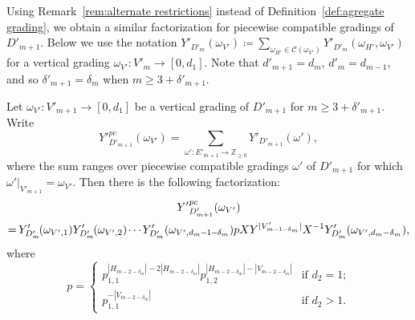 \documentclass[ALCO,ThmDefs,Unicode,epreuves]{cedram}
\newcommand{\cC}{\mathcal{C}}
\newcommand{\ZZ}{\mathbb{Z}}
\newcommand*{\mk}{\mkern -1mu}
\newcommand*{\Mk}{\mkern -2mu}
\begin{document}
Using Remark~\ref{rem:alternate restrictions} instead of Definition~\ref{def:agregate grading}, we obtain a similar factorization for piecewise compatible gradings of $D'_{m+1}$.
Below we use the notation $Y'_{D'_m}(\omega_{V'})\coloneqq \sum_{\omega_{H'}\in\cC(\omega_{V'})}Y'_{D'_m}(\omega_{H'},\omega_{V'})$ for a vertical grading $\omega_{V'}:V'_m\to[0,d_1]$.
Note that $d'_{m+1}=d_m$, $d'_m=d_{m-1}$, and so $\delta'_{m+1}=\delta_m$ when $m\ge3+\delta'_{m+1}$.
\begin{lemma}
 \label{le:piecewise compatible factorization 2}
 Let $\omega_{V'}:V'_{m+1}\to[0,d_1]$ be a vertical grading of $D'_{m+1}$ for $m\ge3+\delta'_{m+1}$.
 Write 
 \[{Y'}_{D'_{m+1}}^{pc}(\omega_{V'})=\sum\limits_{\omega':E'_{m+1}\to\ZZ_{\ge0}} Y'_{D'_{m+1}}(\omega'),\]
 where the sum ranges over piecewise compatible gradings $\omega'$ of $D'_{m+1}$ for which $\omega'|_{V'_{m+1}}=\omega_{V'}$.
 Then there is the following factorization:
 \begin{multline}
 \label{eq:piecewise compatible factorization 2}
 {Y'}_{D'_{m+1}}^{pc}(\omega_{V'})\\
 =\Mk Y'_{D'_m}\Mk (\omega_{V',1})Y'_{D'_m}\Mk (\omega_{V',2})\mk \cdots \mk Y'_{D'_m}(\omega_{V',d_m\mk -\mk 1\mk -\mk \delta_m})pXY^{|V'_{m\mk -\mk 1\mk -\mk \delta_m}|}X^{-1} Y'_{D'_m}(\omega_{V',d_m-\delta_m}),
 \end{multline}
 where 
 \[p=\begin{cases} p_{1,1}^{|H_{m-2-\delta_m}|-2|H_{m-2-\delta_m}|}p_{1,2}^{|H_{m-2-\delta_m}|-|V_{m-2-\delta_m}|} & \text{if $d_2=1$;}\\ p_{1,1}^{-|V_{m-2-\delta_m}|} & \text{if $d_2>1$.}\end{cases}\]
\end{lemma}
\end{document}
